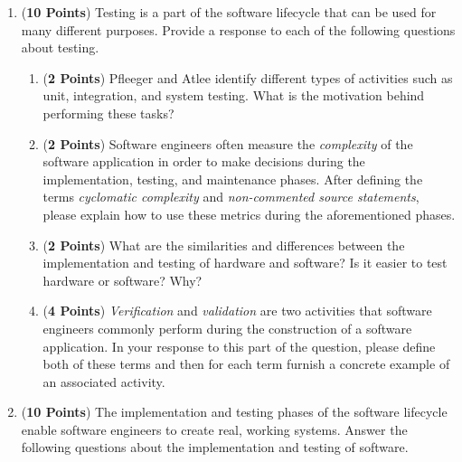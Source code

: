 \documentclass[12pt,epsf,psfig,graphics]{article}
\begin{document}
\begin{enumerate}
\begin{enumerate}
\end{enumerate}

\newpage

\item ({\bf 10 Points}) Testing is a part of the software lifecycle
  that can be used for many different purposes.  Provide a response 
  to each of the following questions about testing.

\begin{enumerate}       
  
\item ({\bf 2 Points}) Pfleeger and Atlee identify different types of
  activities such as unit, integration, and system testing.  What is
  the motivation behind performing these tasks?


\item ({\bf 2 Points}) Software engineers often measure the {\em
  complexity} of the software application in order to make decisions
  during the implementation, testing, and maintenance phases.  After
  defining the terms {\em cyclomatic complexity} and {\em
    non-commented source statements}, please explain how to use these
  metrics during the aforementioned phases.
  
\item ({\bf 2 Points}) What are the similarities and differences
  between the implementation and testing of hardware and software?  Is
  it easier to test hardware or software?  Why?

\item ({\bf 4 Points}) {\em Verification} and {\em validation} are two activities that software engineers commonly
  perform during the construction of a software application.  In your response to this part of the question, please
  define both of these terms and then for each term furnish a concrete example of an associated activity.
  
\end{enumerate}

\newpage

\item ({\bf 10 Points}) The implementation and testing phases of the
  software lifecycle enable software engineers to create real, working
  systems.  Answer the following questions about the implementation
  and testing of software.


\end{enumerate}
\end{document}
